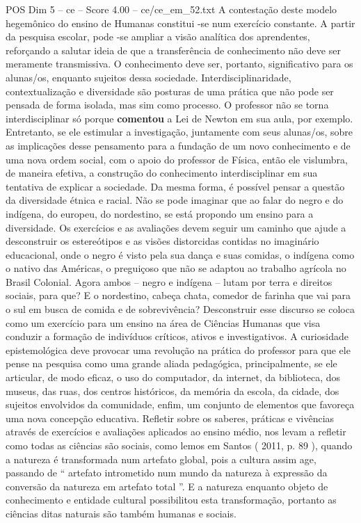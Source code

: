 \begin{textsample}{POS Dim 5 – ce – Score 4.00 – ce/ce\_em\_52.txt}
A contestação deste modelo hegemônico do ensino de Humanas constitui -se num exercício constante.
A partir da pesquisa escolar, pode -se ampliar a visão analítica dos aprendentes, reforçando a salutar ideia de que a transferência de conhecimento não deve ser meramente transmissiva.
O conhecimento deve ser, portanto, significativo para os alunas/os, enquanto sujeitos dessa sociedade.
Interdisciplinaridade, contextualização e diversidade são posturas de uma prática que não pode ser pensada de forma isolada, mas sim como processo.
O professor não se torna interdisciplinar só porque \textbf{comentou} a Lei de Newton em sua aula, por exemplo.
Entretanto, se ele estimular a investigação, juntamente com seus alunas/os, sobre as implicações desse pensamento para a fundação de um novo conhecimento e de uma nova ordem social, com o apoio do professor de Física, então ele vislumbra, de maneira efetiva, a construção do conhecimento interdisciplinar em sua tentativa de explicar a sociedade.
Da mesma forma, é possível pensar a questão da diversidade étnica e racial.
Não se pode imaginar que ao falar do negro e do indígena, do europeu, do nordestino, se está propondo um ensino para a diversidade.
Os exercícios e as avaliações devem seguir um caminho que ajude a desconstruir os estereótipos e as visões distorcidas contidas no imaginário educacional, onde o negro é visto pela sua dança e suas comidas, o indígena como o nativo das Américas, o preguiçoso que não se adaptou ao trabalho agrícola no Brasil Colonial.
Agora ambos – negro e indígena – lutam por terra e direitos sociais, para que?
E o nordestino, cabeça chata, comedor de farinha que vai para o sul em busca de comida e de sobrevivência?
Desconstruir esse discurso se coloca como um exercício para um ensino na área de Ciências Humanas que visa conduzir a formação de indivíduos críticos, ativos e investigativos.
A curiosidade epistemológica deve provocar uma revolução na prática do professor para que ele pense na pesquisa como uma grande aliada pedagógica, principalmente, se ele articular, de modo eficaz, o uso do computador, da internet, da biblioteca, dos museus, das ruas, dos centros históricos, da memória da escola, da cidade, dos sujeitos envolvidos da comunidade, enfim, um conjunto de elementos que favoreça uma nova concepção educativa.
Refletir sobre os saberes, práticas e vivências através de exercícios e avaliações aplicados ao ensino médio, nos levam a refletir como todas as ciências são sociais, como lemos em Santos ( 2011, p. 89 ), quando a natureza é transformada num artefato global, pois a cultura assim age, passando de “ artefato intrometido num mundo da natureza à expressão da conversão da natureza em artefato total ”.
E a natureza enquanto objeto de conhecimento e entidade cultural possibilitou esta transformação, portanto as ciências ditas naturais são também humanas e sociais.

\end{textsample}
